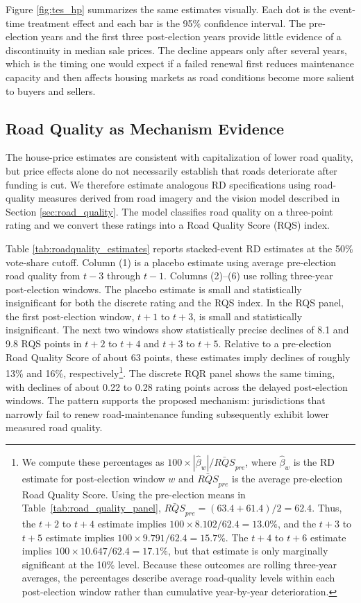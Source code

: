 Figure \ref{fig:tes_hp} summarizes the same estimates visually. Each dot is the event-time treatment effect and each bar is the 95\% confidence interval. The pre-election years and the first three post-election years provide little evidence of a discontinuity in median sale prices. The decline appears only after several years, which is the timing one would expect if a failed renewal first reduces maintenance capacity and then affects housing markets as road conditions become more salient to buyers and sellers.

\subsection{Road Quality as Mechanism Evidence} \label{sec:road_quality_decline}

The house-price estimates are consistent with capitalization of lower road quality, but price effects alone do not necessarily establish that roads deteriorate after funding is cut. We therefore estimate analogous RD specifications using road-quality measures derived from road imagery and the vision model described in Section \ref{sec:road_quality}. The model classifies road quality on a three-point rating and we convert these ratings into a Road Quality Score (RQS) index.



Table \ref{tab:roadquality_estimates} reports stacked-event RD estimates at the 50\% vote-share cutoff. Column (1) is a placebo estimate using average pre-election road quality from $t-3$ through $t-1$. Columns (2)--(6) use rolling three-year post-election windows. The placebo estimate is small and statistically insignificant for both the discrete rating and the RQS index. In the RQS panel, the first post-election window, $t+1$ to $t+3$, is small and statistically insignificant. The next two windows show statistically precise declines of 8.1 and 9.8 RQS points in $t+2$ to $t+4$ and $t+3$ to $t+5$. Relative to a pre-election Road Quality Score of about 63 points, these estimates imply declines of roughly 13\% and 16\%, respectively\footnote{We compute these percentages as $100 \times |\hat{\beta}_w| / \bar{RQS}_{pre}$, where $\hat{\beta}_w$ is the RD estimate for post-election window $w$ and $\bar{RQS}_{pre}$ is the average pre-election Road Quality Score. Using the pre-election means in Table~\ref{tab:road_quality_panel}, $\bar{RQS}_{pre}=(63.4+61.4)/2=62.4$. Thus, the $t+2$ to $t+4$ estimate implies $100 \times 8.102/62.4=13.0\%$, and the $t+3$ to $t+5$ estimate implies $100 \times 9.791/62.4=15.7\%$. The $t+4$ to $t+6$ estimate implies $100 \times 10.647/62.4=17.1\%$, but that estimate is only marginally significant at the 10\% level. Because these outcomes are rolling three-year averages, the percentages describe average road-quality levels within each post-election window rather than cumulative year-by-year deterioration.}. The discrete RQR panel shows the same timing, with declines of about 0.22 to 0.28 rating points across the delayed post-election windows.
The pattern supports the proposed mechanism: jurisdictions that narrowly fail to renew road-maintenance funding subsequently exhibit lower measured road quality.

